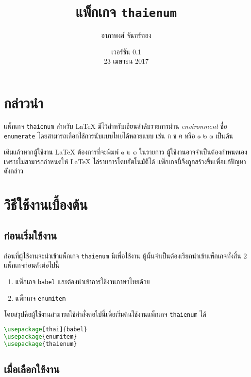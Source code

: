 \documentclass[10pt]{ltxguide}
\title{แพ็กเกจ \textlatin{\texttt{thaienum}}}
\author{อาภาพงศ์ จันทร์ทอง}
\date{เวอร์ชัน 0.1\\23 เมษายน 2017}
\begin{document}
\maketitle

\section{กล่าวนำ}

แพ็กเกจ \textlatin{\texttt{thaienum}} สำหรับ \textrm{\LaTeX} มีไว้สำหรับเขียนลำดับรายการผ่าน \emph{environment} ชื่อ \textlatin{\texttt{enumerate}} โดยสามารถเลือกใช้การนับแบบไทยได้หลายแบบ เช่น ก ข ค หรือ ๑ ๒ ๓ เป็นต้น

เดิมแล้วหากผู้ใช้งาน \textrm{\LaTeX} ต้องการที่จะพิมพ์ ๑ ๒ ๓ ในรายการ ผู้ใช้งานอาจจำเป็นต้องกำหนดเอง เพราะไม่สามารถกำหนดให้ \textrm{\LaTeX} ไล่รายการโดยอัตโนมัติได้  แพ็กเกจนี้จึงถูกสร้างขึ้นเพื่อแก้ปัญหาดังกล่าว

\section{วิธีใช้งานเบื้องต้น}

\subsection{ก่อนเริ่มใช้งาน}

ก่อนที่ผู้ใช้งานจะนำเข้าแพ็กเกจ \textlatin{\texttt{thaienum}} นีเพื่อใช้งาน ผู้นั้นจำเป็นต้องเรียกนำเข้าแพ็กเกจทั้งสิ้น 2 แพ็กเกจก่อนดังต่อไปนี้
\begin{enumerate}[topsep=0pc,itemsep=-0.25pc,label={\thaialph*.}]
    \item  แพ็กเกจ \textlatin{\texttt{babel}} และต้องนำเข้าการใช้งานภาษาไทยด้วย
    \item  แพ็กเกจ \textlatin{\texttt{enumitem}}
\end{enumerate}

\bigskip
โดยสรุปคือผู้ใช้งานสามารถใช้คำสั่งต่อไปนี้เพื่อเริ่มต้นใช้งานแพ็กเกจ \textlatin{\texttt{thaienum}} ได้

\begin{latintext}
\begin{lstlisting}[language=LaTeX,numbers=none]
\usepackage[thai]{babel}
\usepackage{enumitem}
\usepackage{thaienum}
\end{lstlisting}
\end{latintext}

\subsection{เมื่อเลือกใช้งาน}
\end{document}
